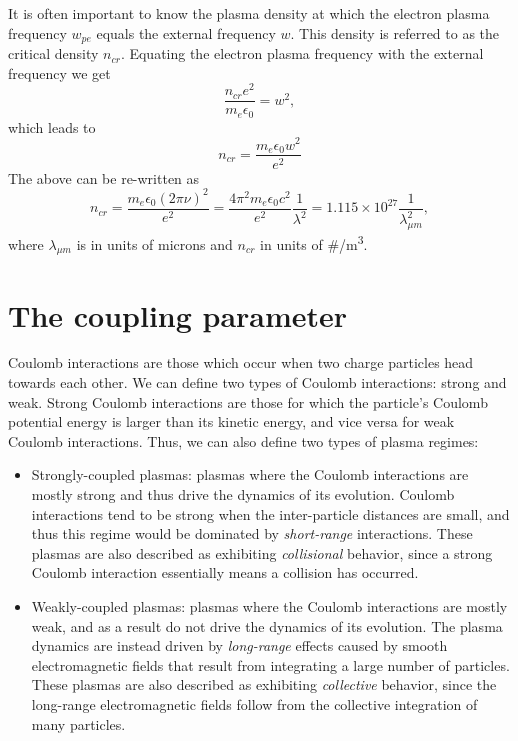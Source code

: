 \documentclass[a4paper,11pt]{report}
\begin{document}
It is often important to know the plasma density at which the electron plasma frequency $w_{pe}$ equals the external frequency $w$. This density is referred to as the critical density $n_{cr}$. Equating the electron plasma frequency with the external frequency we get
\begin{equation*}
    \frac{n_{cr} e^2}{m_e \epsilon_0} = w^2,
\end{equation*}
which leads to
\begin{equation}
    \label{eq:plas_freq_crit_den}
    n_{cr} = \frac{m_e \epsilon_0 w^2}{e^2}
\end{equation}
The above can be re-written as
\begin{equation*}
    n_{cr} = \frac{m_e \epsilon_0 (2 \pi \nu)^2}{e^2} = \frac{4 \pi^2 m_e \epsilon_0 c^2}{e^2} \frac{1}{\lambda^2} = 1.115 \times 10^{27} \frac{1}{\lambda_{\mu m}^2},
\end{equation*}
where $\lambda_{\mu m}$ is in units of microns and $n_{cr}$ in units of \#/m\textsuperscript{3}.

\section{The coupling parameter}

Coulomb interactions are those which occur when two charge particles head towards each other. We can define two types of Coulomb interactions: strong and weak. Strong Coulomb interactions are those for which the particle's Coulomb potential energy is larger than its kinetic energy, and vice versa for weak Coulomb interactions. Thus, we can also define two types of plasma regimes:
\begin{itemize}
    \item Strongly-coupled plasmas: plasmas where the Coulomb interactions are mostly strong and thus drive the dynamics of its evolution. Coulomb interactions tend to be strong when the inter-particle distances are small, and thus this regime would be dominated by \textit{short-range} interactions. These plasmas are also described as exhibiting \textit{collisional} behavior, since a strong Coulomb interaction essentially means a collision has occurred.
    \item Weakly-coupled plasmas: plasmas where the Coulomb interactions are mostly weak, and as a result do not drive the dynamics of its evolution. The plasma dynamics are instead driven by \textit{long-range} effects caused by smooth electromagnetic fields that result from integrating a large number of particles. These plasmas are also described as exhibiting \textit{collective} behavior, since the long-range electromagnetic fields follow from the collective integration of many particles.
\end{itemize}
\end{document}
